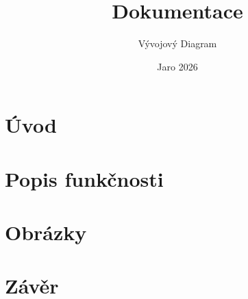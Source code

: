 \documentclass{article}
\title{Dokumentace}
\author{Vývojový Diagram}
\date{Jaro 2026}
\begin{document}
\maketitle

\section{Úvod}
\section{Popis funkčnosti}
\section{Obrázky}
\section{Závěr}

\tableofcontents
\end{document}
